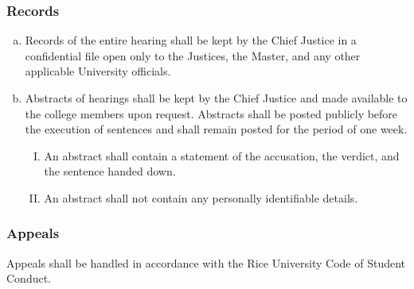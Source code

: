\documentclass[USletter,12pt]{article}
\begin{document}
\begin{enumerate}[(a)]
\subsubsection{Records}
\begin{enumerate}[(a)]
\item Records of the entire hearing shall be kept by the Chief Justice in a confidential file open only to the Justices, the Master, and any other applicable University officials.
\item Abstracts of hearings shall be kept by the Chief Justice and made available to the college members upon request.  Abstracts shall be posted publicly before the execution of sentences and shall remain posted for the period of one week.
	\begin{enumerate}[(I)]
	\item An abstract shall contain a statement of the accusation, the verdict, and the sentence handed down.
	\item An abstract shall not contain any personally identifiable details.
	\end{enumerate}
\end{enumerate}

\subsubsection{Appeals}
Appeals shall be handled in accordance with the Rice University Code of Student Conduct.


\end{enumerate}
\end{document}

